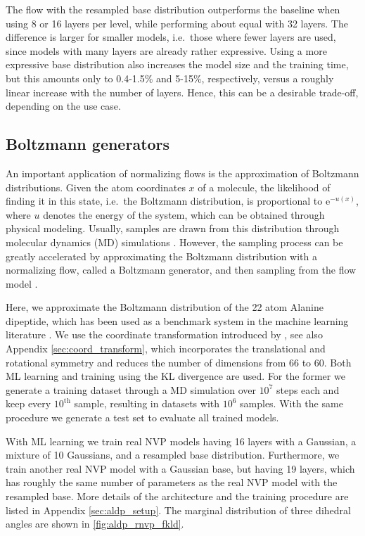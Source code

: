 \documentclass[twoside]{article}
\begin{document}
The flow with the resampled base distribution outperforms the baseline when using 8 or 16 layers per level, while performing about equal with 32 layers. The difference is larger for smaller models, i.e.\ those where fewer layers are used, since models with many layers are already rather expressive. Using a more expressive base distribution also increases the model size and the training time, but this amounts only to 0.4-1.5\% and 5-15\%, respectively, versus a roughly linear increase with the number of layers. Hence, this can be a desirable trade-off, depending on the use case.



\subsection{Boltzmann generators}
\label{sec:boltz_gen}

An important application of normalizing flows is the approximation of Boltzmann distributions. Given the atom coordinates $x$ of a molecule, the likelihood of finding it in this state, i.e.\ the Boltzmann distribution, is proportional to $\mathrm{e}^{-u(x)}$, where $u$ denotes the energy of the system, which can be obtained through physical modeling. Usually, samples are drawn from this distribution through molecular dynamics (MD) simulations \citep{Leimkuhler2015}. However, the sampling process can be greatly accelerated by approximating the Boltzmann distribution with a normalizing flow, called a Boltzmann generator, and then sampling from the flow model \citep{Noe2019}.

Here, we approximate the Boltzmann distribution of the 22 atom Alanine dipeptide, which has been used as a benchmark system in the machine learning literature \citep{Wu2020,Campbell2021,Kohler2021}. We use the coordinate transformation introduced by \cite{Noe2019}, see also Appendix \ref{sec:coord_transform}, which incorporates the translational and rotational symmetry and reduces the number of dimensions from 66 to 60. Both ML learning and training using the KL divergence are used. For the former we generate a training dataset through a MD simulation over $10^7$ steps each and keep every $10^\text{th}$ sample, resulting in datasets with $10^6$ samples. With the same procedure we generate a test set to evaluate all trained models.

With ML learning we train real NVP models having 16 layers with a Gaussian, a mixture of 10 Gaussians, and a resampled base distribution. Furthermore, we train another real NVP model with a Gaussian base, but having 19 layers, which has roughly the same number of parameters as the real NVP model with the resampled base. More details of the architecture and the training procedure are listed in Appendix \ref{sec:aldp_setup}. The marginal distribution of three dihedral angles are shown in \autoref{fig:aldp_rnvp_fkld}.
\end{document}
